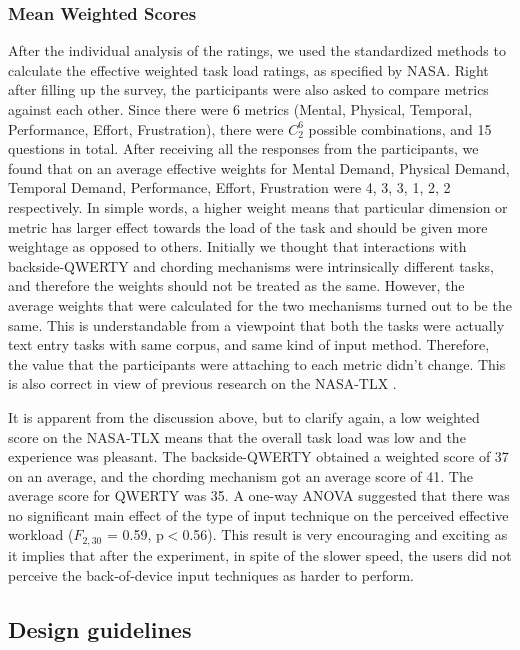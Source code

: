 \subsubsection{Mean Weighted Scores}
After the individual analysis of the ratings, we used the standardized methods to calculate the effective weighted task load ratings, as specified by NASA. Right after filling up the survey, the participants were also asked to compare metrics against each other. Since there were 6 metrics (Mental, Physical, Temporal, Performance, Effort, Frustration), there were $C_{2}^{6}$ possible combinations, and 15 questions in total. After receiving all the responses from the
participants, we found that on an average effective weights for Mental Demand, Physical Demand, Temporal Demand, Performance, Effort, Frustration were 4, 3, 3, 1, 2, 2 respectively. In simple words, a higher weight means that particular dimension or metric has larger effect towards the load of the task and should be given more weightage
as opposed to others. Initially we thought that interactions with backside-QWERTY and chording mechanisms were intrinsically different tasks, and therefore the weights should not be treated as the same. However, the average weights that were calculated for the two mechanisms turned out to be the same. This is understandable from a viewpoint that both the tasks were actually text entry tasks with same corpus, and same kind of input method. Therefore, the value that the participants were attaching to each metric didn't change. This is also correct in view of previous research on the NASA-TLX .

It is apparent from the discussion above, but to clarify again, a low weighted score on the NASA-TLX means that the overall task load was low and the experience was pleasant. The backside-QWERTY obtained a weighted score of 37 on an average, and the chording mechanism got an average score of 41. The average score for QWERTY was 35. A one-way ANOVA suggested that there was no significant main effect of the type of input technique on the perceived effective workload ($F_{2,30}$ = 0.59, p$<$0.56). This result is very encouraging and exciting as it implies that after the experiment, in spite of the slower speed, the users did not perceive the back-of-device input techniques as harder to perform. 

\subsection{Design guidelines}

